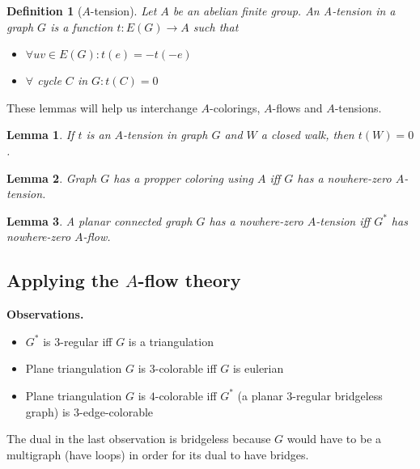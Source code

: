 \documentclass{article}
\newtheorem*{definition}{Definition}
\newtheorem*{lemma}{Lemma}
\begin{document}
\begin{definition}[$A$-tension]
	Let $A$ be an abelian finite group. An \emph{A-tension} in a graph $G$
	is a function $t: E(G) \rightarrow A$ such that
	\begin{itemize}
		\item $\forall uv \in E(G): t(e) = -t(-e)$
		\item $\forall$ cycle $C$ in $G: t(C) = 0$
	\end{itemize}
\end{definition}

\noindent
These lemmas will help us interchange $A$-colorings, $A$-flows and
$A$-tensions.

\begin{lemma}
	If $t$ is an $A$-tension in graph $G$ and $W$ a closed walk, then
	$t(W) = 0$.
\end{lemma}

\begin{lemma}
	Graph $G$ has a propper coloring using $A$ iff $G$ has a nowhere-zero
	$A$-tension.
\end{lemma}

\begin{lemma}
	A planar connected graph $G$ has a nowhere-zero $A$-tension iff $G^*$
	has nowhere-zero $A$-flow.
\end{lemma}

%

\subsection*{Applying the $A$-flow theory}

\textbf{Observations.}
\begin{itemize}
	\item $G^*$ is $3$-regular iff $G$ is a triangulation
	\item Plane triangulation $G$ is $3$-colorable iff $G$ is eulerian
	\item Plane triangulation $G$ is $4$-colorable iff $G^*$ (a planar
		$3$-regular bridgeless graph) is $3$-edge-colorable
\end{itemize}

\noindent
The dual in the last observation is bridgeless because $G$ would have to be a
multigraph (have loops) in order for its dual to have bridges.
\end{document}

